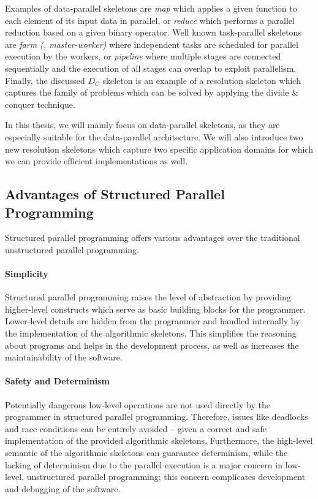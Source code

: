 Examples of data-parallel skeletons are \emph{map} which applies a given function to each element of its input data in parallel, or \emph{reduce} which performs a parallel reduction based on a given binary operator.
Well known task-parallel skeletons are \emph{farm (\aka, master-worker)} where independent tasks are scheduled for parallel execution by the workers, or \emph{pipeline} where multiple stages are connected sequentially and the execution of all stages can overlap to exploit parallelism.
Finally, the discussed $D_C$ skeleton is an example of a resolution skeleton which captures the family of problems which can be solved by applying the divide \& conquer technique.

In this thesis, we will mainly focus on data-parallel skeletons, as they are especially suitable for the data-parallel \GPU architecture.
We will also introduce two new resolution skeletons which capture two specific application domains for which we can provide efficient \GPU implementations as well.

\subsection{Advantages of Structured Parallel Programming}
Structured parallel programming offers various advantages over the traditional unstructured parallel programming.

\bigskip

\paragraph{Simplicity}
Structured parallel programming raises the level of abstraction by providing higher-level constructs which serve as basic building blocks for the programmer.
Lower-level details are hidden from the programmer and handled internally by the implementation of the algorithmic skeletons.
This simplifies the reasoning about programs and helps in the development process, as well as increases the maintainability of the software.

\paragraph{Safety and Determinism}
Potentially dangerous low-level operations are not used directly by the programmer in structured parallel programming.
Therefore, issues like deadlocks and race conditions can be entirely avoided -- given a correct and safe implementation of the provided algorithmic skeletons.
Furthermore, the high-level semantic of the algorithmic skeletons can guarantee determinism, while the lacking of determinism due to the parallel execution is a major concern in low-level, unstructured parallel programming; this concern complicates development and debugging of the software.

